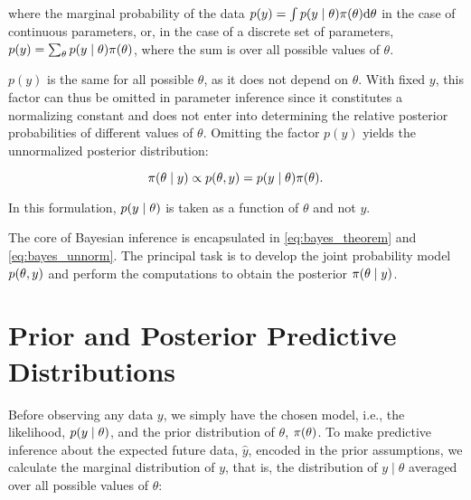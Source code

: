 where the marginal probability of the data $p(y) = \int p \qty(y \mid \theta) \pi \qty(\theta) \dd \theta$ in the case of continuous parameters, or, in the case of a discrete set of parameters, $p(y) = \sum_\theta p \qty(y \mid \theta) \pi \qty(\theta)$, where the sum is over all possible values of $\theta$.

$p(y)$ is the same for all possible $\theta$, as it does not depend on $\theta$. With fixed $y$, this factor can thus be omitted in parameter inference since it constitutes a normalizing constant and does not enter into determining the relative posterior probabilities of different values of $\theta$. Omitting the factor $p(y)$ yields the unnormalized posterior distribution: 

\begin{equation}\label{eq:bayes_unnorm}
    \pi \qty(\theta \mid y) \propto p(\theta, y) =  p \qty(y \mid \theta) \pi \qty(\theta) .
\end{equation}

In this formulation, $p \qty(y \mid \theta)$ is taken as a function of $\theta$ and not $y$.  

The core of Bayesian inference is encapsulated in \autoref{eq:bayes_theorem} and \autoref{eq:bayes_unnorm}. The principal task is to develop the joint probability model $p(\theta, y)$ and perform the computations to obtain the posterior $\pi \qty(\theta \mid y)$.


\section{Prior and Posterior Predictive Distributions}\label{sec:predictive_dist}

Before observing any data $y$, we simply have the chosen model, i.e., the likelihood, $p \qty(y \mid \theta)$, and the prior distribution of $\theta$, $\pi \qty(\theta)$. To make predictive inference about the expected future data, $\hat{y}$, encoded in the prior assumptions, we calculate the marginal distribution of $y$, that is, the distribution of $y \mid \theta$ averaged over all possible values of $\theta$:

